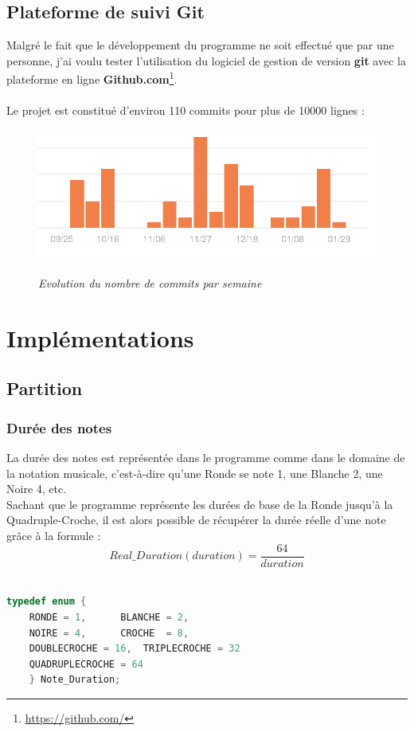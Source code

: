 \documentclass[12pt]{report}
\begin{document}
\section{Plateforme de suivi Git}
Malgré le fait que le développement du programme ne soit effectué que par une personne, j'ai voulu tester l'utilisation du logiciel de gestion de version \textbf{git}
avec la plateforme en ligne \textbf{Github.com}\footnote{\url{https://github.com/}}.\\ \\
Le projet est constitué d'environ 110 commits pour plus de 10000 lignes :\\

\begin{figure}[H]
  \centering
  \includegraphics[scale=0.58]{git2.png}\\
    \caption{\textit{Evolution du nombre de commits par semaine}}
\end{figure}


\chapter{Implémentations}
\section{Partition}
\subsection{Durée des notes}
La durée des notes est représentée dans le programme comme dans le domaine de la notation musicale, c'est-à-dire qu'une Ronde se note 1, une Blanche 2, une Noire 4, etc.\\
Sachant que le programme représente les durées de base de la Ronde jusqu'à la Quadruple-Croche, il est alors possible de récupérer la durée réelle d'une note grâce à la formule :\\
\[ Real\_Duration(duration) = \frac{64}{duration} \]\\
\lstset{style=CLangage}
\begin{lstlisting}[language=C]
typedef enum {
	RONDE = 1,		BLANCHE	= 2,
	NOIRE = 4,		CROCHE	= 8,
	DOUBLECROCHE = 16, 	TRIPLECROCHE = 32
	QUADRUPLECROCHE = 64
	} Note_Duration;
\end{lstlisting}
\newpage
\end{document}
